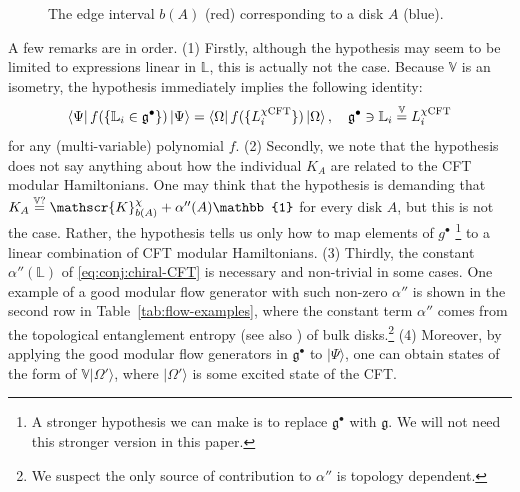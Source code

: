 \documentclass[12pt, nofootinbib]{article}
\theoremstyle{plain}
\theoremstyle{assumption}
\theoremstyle{definition}
\theoremstyle{plain}
\theoremstyle{plain}
\theoremstyle{plain}
\theoremstyle{plain}
\theoremstyle{plain}
\def\veq{\stackrel{\mathbb{V}}{=}}
\def\Lb{\mathbb{L}}
\def\Kcft{\mathscr{K}}
\def\gc{\mathfrak{g}^{\bullet}}
\begin{document}
\begin{figure}[h]
    \centering
    \caption{The edge interval $b(A)$ (red) corresponding to a disk $A$ (blue).}
    \label{fig:bulk_region_vs_boundary_region}
\end{figure}


A few remarks are in order. (1) Firstly, although the hypothesis may seem to be limited to expressions linear in $\mathbb{L}$, this is actually not the case. Because $\mathbb{V}$ is an isometry, the hypothesis immediately implies the following identity:  
\begin{equation}\label{eq:identity_polynomial}
    \bra{\Psi} f(\{\Lb_i \in \gc\})\ket{\Psi}  = \bra{\Omega} f(\{ L^{\chi\mathrm{CFT}}_i \}) \ket{\Omega},\quad \gc \ni \Lb_i \veq L^{\chi\mathrm{CFT}}_i
\end{equation}
for any (multi-variable) polynomial $f$. 
(2) Secondly, we note that the hypothesis does not say anything about how the individual $K_A$ are related to the CFT modular Hamiltonians. One may think that the hypothesis is demanding that $K_A \buildrel{\mathbb{V}?}\over{=}\Kcft_{b(A)}^{\chi} + \alpha''(A)\mathbb{1}$ for every disk $A$, but this is not the case. Rather, the hypothesis tells us only how to map elements of $g^{\bullet}$ \footnote{A stronger hypothesis we can make is to replace $\mathfrak{g}^\bullet$ with $\mathfrak{g}$. We will not need this stronger version in this paper.} to a linear combination of CFT modular Hamiltonians. (3) Thirdly, the constant $\alpha''(\mathbb{L})$ of \eqref{eq:conj:chiral-CFT} is necessary and non-trivial in some cases. One example of a good modular flow generator with such non-zero $\alpha''$ is shown in the second row in Table~\ref{tab:flow-examples}, where the constant term $\alpha''$ comes from the topological entanglement entropy \cite{Kitaev2006,Levin2006} (see also \cite{shi2020fusion}) of bulk disks.\footnote{We suspect the only source of contribution to $\alpha''$ is topology dependent.} 
(4) Moreover, by applying the good modular flow generators in $\mathfrak{g}^\bullet$ to $|\Psi\rangle$, one can obtain states of the form of $\mathbb{V}|\Omega'\rangle$, where $|\Omega'\rangle$ is some excited state of the CFT. 
\end{document}
